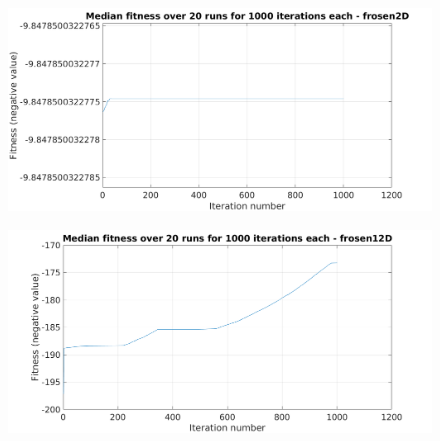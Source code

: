\documentclass[paper=a4, fontsize=11pt]{scrartcl} %
\begin{document}
    \begin{figure}[H]
        \centering
        \begin{minipage}{.8\textwidth}
            \centering
            \includegraphics[width=.95\linewidth]{t3-funcMin-fitness-frosen2D}
            \label{fig:boxplot}
        \end{minipage}%
        \linebreak
        \begin{minipage}{.8\textwidth}
            \centering
            \includegraphics[width=.95\linewidth]{t3-funcMin-fitness-frosen12D}
            \label{fig:median}
        \end{minipage}
    \end{figure}
\end{document}
